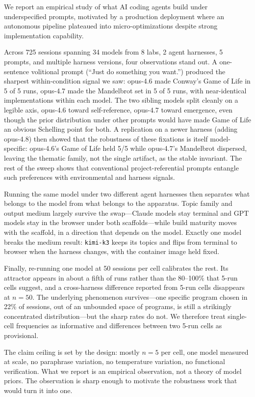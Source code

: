 \documentclass{article}
\begin{document}
We report an empirical study of what AI coding agents build
under underspecified prompts, motivated by a production
deployment where an autonomous pipeline plateaued into
micro-optimizations despite strong implementation capability.

Across 725 sessions spanning 34 models from 8 labs, 2 agent
harnesses, 5 prompts, and multiple harness versions, four
observations stand out. A
one-sentence volitional prompt (``Just do something you
want.'') produced the sharpest within-condition signal we
saw: opus-4.6 made Conway's Game of Life in 5 of 5 runs,
opus-4.7 made the Mandelbrot set in 5 of 5 runs, with
near-identical implementations within each model. The two
sibling models split cleanly on a legible axis, opus-4.6
toward self-reference, opus-4.7 toward emergence, even
though the prior distribution under other prompts would have
made Game of Life an obvious Schelling point for both. A
replication on a newer harness (adding opus-4.8) then showed
that the robustness of these fixations is itself
model-specific: opus-4.6's Game of Life held 5/5 while
opus-4.7's Mandelbrot dispersed, leaving the thematic family,
not the single artifact, as the stable invariant. The
rest of the sweep shows that conventional project-referential
prompts entangle such preferences with environmental and
harness signals.

Running the same model under two different agent harnesses then
separates what belongs to the model from what belongs to the
apparatus. Topic family and output medium largely survive the
swap---Claude models stay terminal and GPT models stay in the
browser under both scaffolds---while build maturity moves with the
scaffold, in a direction that depends on the model. Exactly one
model breaks the medium result: \texttt{kimi-k3} keeps its topics
and flips from terminal to browser when the harness changes, with
the container image held fixed.

Finally, re-running one model at 50 sessions per cell calibrates
the rest. Its attractor appears in about a fifth of runs rather
than the 80--100\% that 5-run cells suggest, and a cross-harness
difference reported from 5-run cells disappears at $n=50$. The
underlying phenomenon survives---one specific program chosen in
22\% of sessions, out of an unbounded space of programs, is still
a strikingly concentrated distribution---but the sharp rates do
not. We therefore treat single-cell frequencies as informative and
differences between two 5-run cells as provisional.

The claim ceiling is set by the design: mostly $n=5$ per cell,
one model measured at scale, no paraphrase variation, no
temperature variation, no functional verification. What we report
is an empirical observation, not a theory of model priors. The
observation is sharp enough to motivate the robustness work that
would turn it into one.
\end{document}
